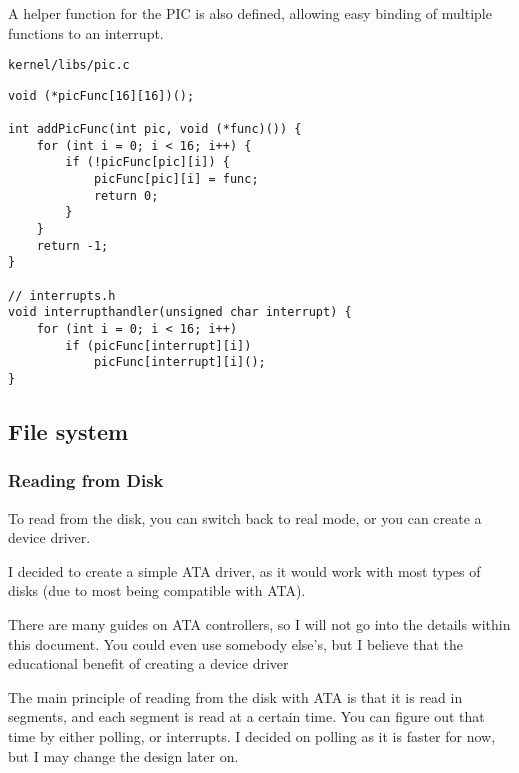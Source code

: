 \documentclass{article}
\begin{document}
A helper function for the PIC is also defined, allowing
easy binding of multiple functions to an interrupt.

\begin{verbatim}
kernel/libs/pic.c
\end{verbatim}
\begin{verbatim}
void (*picFunc[16][16])();

int addPicFunc(int pic, void (*func)()) {
	for (int i = 0; i < 16; i++) {
		if (!picFunc[pic][i]) {
			picFunc[pic][i] = func;
			return 0;
		}
	}
	return -1;
}

// interrupts.h
void interrupthandler(unsigned char interrupt) {
	for (int i = 0; i < 16; i++)
		if (picFunc[interrupt][i])
			picFunc[interrupt][i]();
}
\end{verbatim}

\subsection{File system}

\subsubsection{Reading from Disk}

To read from the disk, you can switch back to real mode, or
you can create a device driver.

I decided to create a simple ATA driver, as it would work with
most types of disks (due to most being compatible with ATA).

There are many guides on ATA controllers, so I will not go into
the details within this document. You could even use somebody
else's, but I believe that the educational benefit of creating
a device driver 

The main principle of reading from the disk with ATA is that it
is read in segments, and each segment is read at a certain time.
You can figure out that time by either polling, or interrupts. I
decided on polling as it is faster for now, but I may change the
design later on.
\end{document}
